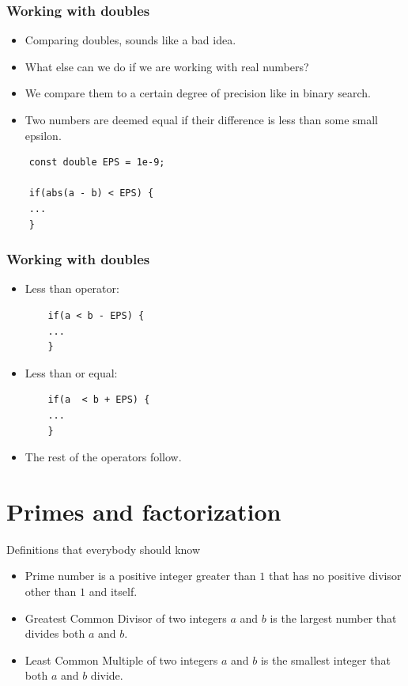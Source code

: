 \documentclass{beamer}
\begin{document}
\begin{frame}
  \frametitle{Working with doubles}
  \vspace{30pt}
  \begin{itemize}
    \item Comparing doubles, sounds like a bad idea.
    \item What else can we do if we are working with real numbers?
    \item We compare them to a certain degree of precision like in binary search.
    \item Two numbers are deemed equal if their difference is less than some small epsilon.
  \end{itemize}

    \begin{verbatim}
    const double EPS = 1e-9;

    if(abs(a - b) < EPS) {
    ...
    }
    \end{verbatim}
\end{frame}

\begin{frame}
  \frametitle{Working with doubles}
  \vspace{30pt}
  \begin{itemize}
    \item Less than operator:
      \begin{verbatim}
    if(a < b - EPS) {
    ...
    }
      \end{verbatim}
    \item Less than or equal:
      \begin{verbatim}
    if(a  < b + EPS) {
    ...
    }
    \end{verbatim}
    \item The rest of the operators follow.
  \end{itemize}
\end{frame}

\section*{Primes and factorization}

\begin{frame}[plain]{Definitions that everybody should know}
  \vspace{15pt}
  \begin{itemize}
    \item {\color{red}Prime number} is a positive integer greater than $1$
      that has no positive divisor other than $1$ and itself.
    \item {\color{red}Greatest Common Divisor} of two integers $a$ and $b$ is the
      largest number that divides both $a$ and $b$.
    \item {\color{red}Least Common Multiple} of two integers $a$ and $b$ is
      the smallest integer that both $a$ and $b$ divide.
  \end{itemize}
\end{frame}
\end{document}
